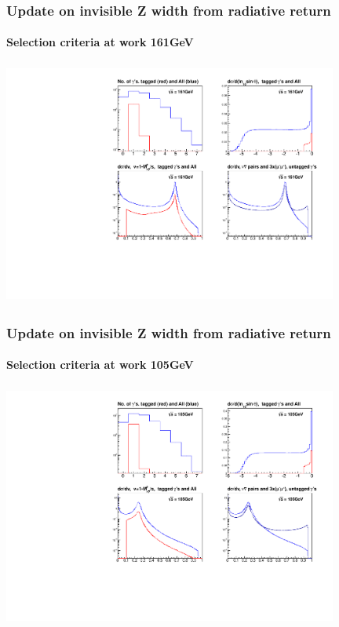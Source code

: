 \documentclass{beamer}
\begin{document}
\begin{frame}[fragile]
\frametitle{\bf Update on invisible Z width from radiative return}
\framesubtitle{\bf\large Selection criteria at work 161GeV}

\includegraphics[width=110mm,height=80mm]{./cFigInfo_E161.pdf}
\end{frame}

\begin{frame}[fragile]
\frametitle{\bf Update on invisible Z width from radiative return}
\framesubtitle{\bf\large Selection criteria at work 105GeV}

\includegraphics[width=110mm,height=80mm]{./cFigInfo_E105.pdf}
\end{frame}
\end{document}
